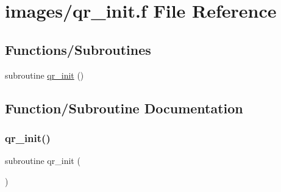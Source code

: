 \hypertarget{images_2qr__init_8f}{}\section{images/qr\+\_\+init.f File Reference}
\label{images_2qr__init_8f}
\subsection*{Functions/\+Subroutines}
\begin{DoxyCompactItemize}
\item 
subroutine \hyperlink{images_2qr__init_8f_af7240c14716ac7a794546a49beaf0d88}{qr\+\_\+init} ()
\end{DoxyCompactItemize}


\subsection{Function/\+Subroutine Documentation}
\mbox{\label{images_2qr__init_8f_af7240c14716ac7a794546a49beaf0d88}} 
\subsubsection{\texorpdfstring{qr\+\_\+init()}{qr\_init()}}
{\footnotesize\ttfamily subroutine qr\+\_\+init (\begin{DoxyParamCaption}{ }\end{DoxyParamCaption})}


